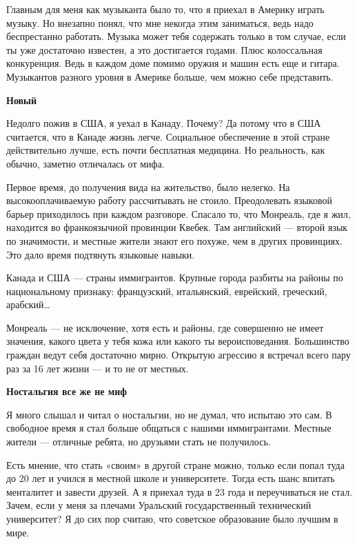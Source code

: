 Главным для меня как музыканта было то, что я приехал в Америку играть музыку. Но внезапно понял, что мне некогда этим заниматься, ведь надо беспрестанно работать. Музыка может тебя содержать только в том случае, если ты уже достаточно известен, а это достигается годами. Плюс колоссальная конкуренция. Ведь в каждом доме помимо оружия и машин есть еще и гитара. Музыкантов разного уровня в Америке больше, чем можно себе представить.

\textbf{Новый }

Недолго пожив в США, я уехал в Канаду. Почему? Да потому что в США считается, что в Канаде жизнь легче. Социальное обеспечение в этой стране действительно лучше, есть почти бесплатная медицина. Но реальность, как обычно, заметно отличалась от мифа.

Первое время, до получения вида на жительство, было нелегко. На высокооплачиваемую работу рассчитывать не стоило. Преодолевать языковой барьер приходилось при каждом разговоре. Спасало то, что Монреаль, где я жил, находится во франкоязычной провинции Квебек. Там английский — второй язык по значимости, и местные жители знают его похуже, чем в других провинциях. Это дало время подтянуть языковые навыки.

\begin{fancyquotes}
    Канада и США — страны иммигрантов. Крупные города разбиты на районы по национальному признаку: французский, итальянский, еврейский, греческий, арабский…
\end{fancyquotes}

Монреаль — не исключение, хотя есть и районы, где совершенно не имеет значения, какого цвета у тебя кожа или какого ты вероисповедания. Большинство граждан ведут себя достаточно мирно. Открытую агрессию я встречал всего пару раз за 16 лет жизни — и то не от местных.


\textbf{Ностальгия все же не миф}

Я много слышал и читал о ностальгии, но не думал, что испытаю это сам. В свободное время я стал больше общаться с нашими иммигрантами. Местные жители — отличные ребята, но друзьями стать не получилось.

Есть мнение, что стать «своим» в другой стране можно, только если попал туда до 20 лет и учился в местной школе и университете. Тогда есть шанс впитать менталитет и завести друзей. А я приехал туда в 23 года и переучиваться не стал. Зачем, если у меня за плечами Уральский государственный технический университет? Я до сих пор считаю, что советское образование было лучшим в мире.

